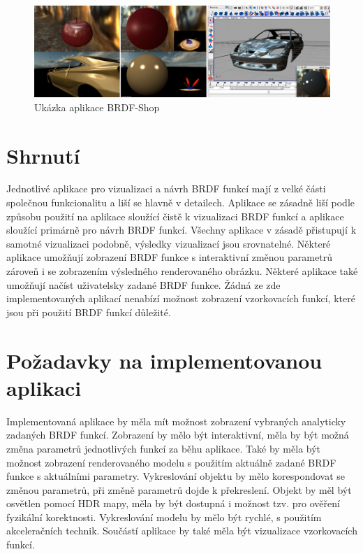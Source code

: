 \documentclass[czech,master]{diploma}
\begin{document}
\begin{figure}[ht]
  \centering
  \includegraphics[width=\textwidth]{Figures/BRDFShop.jpg}
  \caption{Ukázka aplikace BRDF-Shop}%
  \label{fig:brdfshopapp}%
\end{figure}

\section{Shrnutí}
Jednotlivé aplikace pro vizualizaci a návrh BRDF funkcí mají z velké části společnou funkcionalitu a liší se hlavně v detailech. Aplikace se zásadně liší podle způsobu použití na aplikace sloužící čistě k vizualizaci BRDF funkcí a aplikace sloužící primárně pro návrh BRDF funkcí. Všechny aplikace v zásadě přistupují k samotné vizualizaci podobně, výsledky vizualizací jsou srovnatelné. Některé aplikace umožňují zobrazení BRDF funkce s interaktivní změnou parametrů zároveň i se zobrazením výsledného renderovaného obrázku. Některé aplikace také umožňují načíst uživatelsky zadané BRDF funkce. Žádná ze zde implementovaných aplikací nenabízí možnost zobrazení vzorkovacích funkcí, které jsou při použití BRDF funkcí důležité.

\section{Požadavky na implementovanou aplikaci}
Implementovaná aplikace by měla mít možnost zobrazení vybraných analyticky zadaných BRDF funkcí. Zobrazení by mělo být interaktivní, měla by být možná změna parametrů jednotlivých funkcí za běhu aplikace. Také by měla být možnost zobrazení renderovaného modelu s použitím aktuálně zadané BRDF funkce s aktuálními parametry. Vykreslování objektu by mělo korespondovat se změnou parametrů, při změně parametrů dojde k překreslení. Objekt by měl být osvětlen pomocí HDR mapy, měla by být dostupná i možnost tzv.  pro ověření fyzikální korektnosti. Vykreslování modelu by mělo být rychlé, s použitím akceleračních technik. Součástí aplikace by také měla být vizualizace vzorkovacích funkcí.
\end{document}
